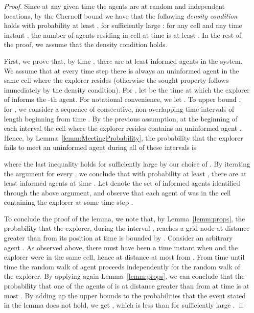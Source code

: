 \documentclass[11pt]{article}
\begin{document}
\begin{proof}
Since at any given time the agents are at random and independent
locations, by the Chernoff bound we have that the following
\emph{density condition} holds with probability at least ,
for sufficiently large :
for any cell  and any time instant ,
the number of agents residing in cell  at time 
is at least .
In the rest of the proof, we assume that the density condition holds.

First, we prove that, by time , there are at least  informed agents in the system. We assume that at every time
step  there is always an uninformed agent in the
same cell where the explorer resides (otherwise the sought property
follows immediately by the density condition). For , let  be the time at which the explorer
of  informs the -th agent.  For notational convenience, we let
.  To upper bound , for , we consider a
sequence of  consecutive, non-overlapping time
intervals of length  beginning from time .  By the
previous assumption, at the beginning of each interval the cell where
the explorer resides contains an uninformed agent .  Hence, by
Lemma~\ref{lemm:MeetingProbability}, the probability that the explorer
fails to meet an uninformed agent during all of these intervals is

where the last inequality holds for sufficiently large 
by our choice of .
By iterating the argument
for every , we conclude that with probability at least ,
there are at least  informed agents at time
.  Let  denote the set of informed agents identified
through the above argument, and observe that each agent of  was in
the cell containing the explorer at some time step .

To conclude the proof of the lemma, we note that, by
Lemma~\ref{lemm:props}, the probability that
the explorer, during the interval ,
reaches a grid node at distance greater than 
from its position at time  is bounded by .
Consider an arbitrary agent . As observed above,
there must have been a time instant  when
 and the explorer were in the same cell, hence at distance at most
 from .  From time  until
time  the random walk of agent  proceeds independently for
the random walk of the explorer.  By applying again
Lemma~\ref{lemm:props}, we can conclude that the probability that one
of the agents of  is at distance greater than 
from  at time  is at most .
By adding up the upper bounds to the probabilities that the event stated
in the lemma does not hold, we get
,
which is less than  for sufficiently large .
\end{proof}
\end{document}
